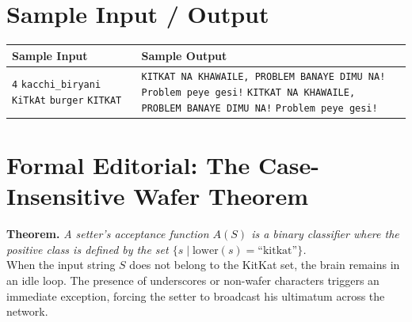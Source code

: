 \documentclass[11pt, a4paper]{article}
\begin{document}
\section*{Sample Input / Output}
\begin{table}[h]
\centering
\begin{tabular}{|p{}|p{}|}
\hline
\textbf{Sample Input} & \textbf{Sample Output} \\ \hline
\texttt{4} \newline \texttt{kacchi\_biryani} \newline \texttt{KiTkAt} \newline \texttt{burger} \newline \texttt{KITKAT} & 
\texttt{KITKAT NA KHAWAILE, PROBLEM BANAYE DIMU NA!} \newline 
\texttt{Problem peye gesi!} \newline 
\texttt{KITKAT NA KHAWAILE, PROBLEM BANAYE DIMU NA!} \newline 
\texttt{Problem peye gesi!} \\ \hline
\end{tabular}
\end{table}

\section*{Formal Editorial: The Case-Insensitive Wafer Theorem}
\textbf{Theorem.} \textit{A setter's acceptance function $A(S)$ is a binary classifier where the positive class is defined by the set $\{s \mid \text{lower}(s) = \text{``kitkat''}\}$.} \\
When the input string $S$ does not belong to the KitKat set, the brain remains in an idle loop. The presence of underscores or non-wafer characters triggers an immediate exception, forcing the setter to broadcast his ultimatum across the network.
\end{document}
